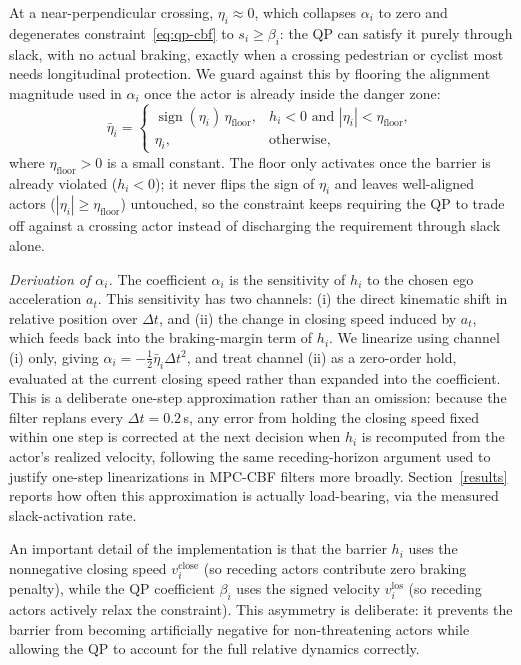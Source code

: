 At a near-perpendicular crossing, $\eta_i \approx 0$, which collapses $\alpha_i$ to zero and degenerates constraint~\eqref{eq:qp-cbf} to $s_i \ge \beta_i$: the QP can satisfy it purely through slack, with no actual braking, exactly when a crossing pedestrian or cyclist most needs longitudinal protection. We guard against this by flooring the alignment magnitude used in $\alpha_i$ once the actor is already inside the danger zone:
\begin{equation}
\bar\eta_i =
\begin{cases}
\operatorname{sign}(\eta_i)\,\eta_{\text{floor}}, & h_i < 0 \text{ and } |\eta_i| < \eta_{\text{floor}}, \\
\eta_i, & \text{otherwise},
\end{cases}
\end{equation}
where $\eta_{\text{floor}} > 0$ is a small constant. The floor only activates once the barrier is already violated ($h_i < 0$); it never flips the sign of $\eta_i$ and leaves well-aligned actors ($|\eta_i| \ge \eta_{\text{floor}}$) untouched, so the constraint keeps requiring the QP to trade off against a crossing actor instead of discharging the requirement through slack alone.

\textit{Derivation of $\alpha_i$.} The coefficient $\alpha_i$ is the sensitivity of $h_i$ to the chosen ego acceleration $a_t$. This sensitivity has two channels: (i) the direct kinematic shift in relative position over $\Delta t$, and (ii) the change in closing speed induced by $a_t$, which feeds back into the braking-margin term of $h_i$. We linearize using channel (i) only, giving $\alpha_i = -\tfrac{1}{2}\bar\eta_i \Delta t^2$, and treat channel (ii) as a zero-order hold, evaluated at the current closing speed rather than expanded into the coefficient. This is a deliberate one-step approximation rather than an omission: because the filter replans every $\Delta t{=}0.2$\,s, any error from holding the closing speed fixed within one step is corrected at the next decision when $h_i$ is recomputed from the actor's realized velocity, following the same receding-horizon argument used to justify one-step linearizations in MPC-CBF filters more broadly. Section~\ref{results} reports how often this approximation is actually load-bearing, via the measured slack-activation rate.

An important detail of the implementation is that the barrier $h_i$ uses the nonnegative closing speed $v_i^{\text{close}}$ (so receding actors contribute zero braking penalty), while the QP coefficient $\beta_i$ uses the signed velocity $v_i^{\text{los}}$ (so receding actors actively relax the constraint). This asymmetry is deliberate: it prevents the barrier from becoming artificially negative for non-threatening actors while allowing the QP to account for the full relative dynamics correctly.


